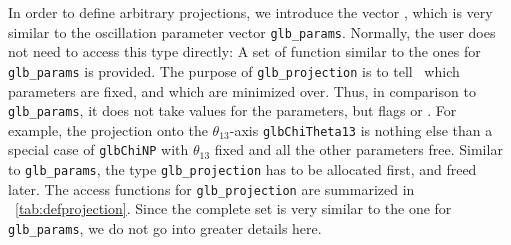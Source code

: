 In order to define arbitrary projections, we introduce the vector
, which is very similar to the
oscillation parameter vector {\tt glb\_params}.
Normally, the user does not need to access this type directly:
A set of function similar to the ones for {\tt glb\_params} is
provided. The purpose of {\tt glb\_projection} is to tell \GLOBES\ 
which parameters are fixed, and which are minimized over. Thus, in
comparison to {\tt glb\_params}, it does not take values for the
parameters, but flags \GLBC{GLB\_FIXED} or \GLBC{GLB\_FREE}.
For example, the projection onto the $\theta_{13}$-axis {\tt glbChiTheta13}
is nothing else than a special case of {\tt glbChiNP} with $\theta_{13}$
fixed and all the other parameters free. Similar to {\tt glb\_params},
the type {\tt glb\_projection} has to be allocated first, and freed
later. The access functions for {\tt glb\_projection} are summarized in \Tab~\ref{tab:defprojection}. Since the complete set is very similar to
the one for {\tt glb\_params}, we do not go into greater details here.

